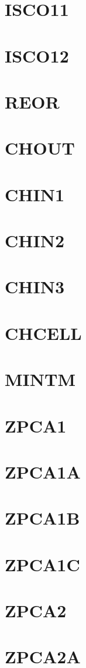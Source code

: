 \documentclass[10pt,UTF8]{ctexbook}
\begin{document}
\section{ISCO11}
\section{ISCO12}
\section{REOR}
\section{CHOUT}
\section{CHIN1}
\section{CHIN2}
\section{CHIN3}
\section{CHCELL}
\section{MINTM}
\section{ZPCA1}
\section{ZPCA1A}
\section{ZPCA1B}
\section{ZPCA1C}
\section{ZPCA2}
\section{ZPCA2A}
\end{document}
